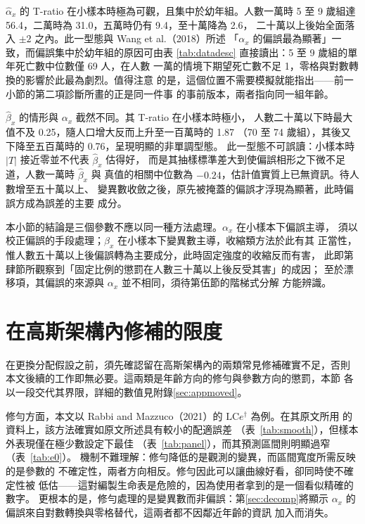 \documentclass[UTF8, fontset=macnew, a4paper, 12pt]{ctexart}
\newcommand{\LCe}{\mathrm{LC}e^{\dagger}}
\begin{document}
$\hat\alpha_x$ 的 T-ratio 在小樣本時極為可觀，且集中於幼年組。人數一萬時
5 至 9 歲組達 56.4，二萬時為 31.0，五萬時仍有 9.4，至十萬降為 2.6，
二十萬以上後始全面落入 $\pm2$ 之內。此一型態與 Wang et al.（2018）所述
「$\alpha_x$ 的偏誤最為顯著」一致，而偏誤集中於幼年組的原因可由表
\ref{tab:datadesc} 直接讀出：5 至 9 歲組的單年死亡數中位數僅 69 人，在人數
一萬的情境下期望死亡數不足 1，零格與對數轉換的影響於此最為劇烈。值得注意
的是，這個位置不需要模擬就能指出——前一小節的第二項診斷所畫的正是同一件事
的事前版本，兩者指向同一組年齡。

$\hat\beta_x$ 的情形與 $\alpha_x$ 截然不同。其 T-ratio 在小樣本時極小，
人數二十萬以下時最大值不及 0.25，隨人口增大反而上升至一百萬時的 1.87
（70 至 74 歲組），其後又下降至五百萬時的 0.76，呈現明顯的非單調型態。
此一型態不可誤讀：小樣本時 $|T|$ 接近零並不代表 $\hat\beta_x$ 估得好，
而是其抽樣標準差大到使偏誤相形之下微不足道，人數一萬時 $\hat\beta_x$ 與
真值的相關中位數為 $-0.24$，估計值實質上已無資訊。待人數增至五十萬以上、
變異數收斂之後，原先被掩蓋的偏誤才浮現為顯著，此時偏誤方成為誤差的主要
成分。

本小節的結論是三個參數不應以同一種方法處理。$\alpha_x$ 在小樣本下偏誤主導，
須以校正偏誤的手段處理；$\beta_x$ 在小樣本下變異數主導，收縮類方法於此有其
正當性，惟人數五十萬以上後偏誤轉為主要成分，此時固定強度的收縮反而有害，
此即第肆節所觀察到「固定比例的懲罰在人數三十萬以上後反受其害」的成因；
至於漂移項，其偏誤的來源與 $\alpha_x$ 並不相同，須待第伍節的階梯式分解
方能辨識。

\section{在高斯架構內修補的限度}\label{sec:limits}

在更換分配假設之前，須先確認留在高斯架構內的兩類常見修補確實不足，否則
本文後續的工作即無必要。這兩類是年齡方向的修勻與參數方向的懲罰，本節
各以一段交代其界限，詳細的數值見附錄\ref{sec:appmoved}。

修勻方面，本文以 Rabbi and Mazzuco（2021）的 $\LCe$ 為例。在其原文所用
的資料上，該方法確實如原文所述具有較小的配適誤差
（表~\ref{tab:smooth}），但樣本外表現僅在極少數設定下最佳
（表~\ref{tab:panel}），而其預測區間則明顯過窄（表~\ref{tab:e0}）。
機制不難理解：修勻降低的是觀測的變異，而區間寬度所需反映的是參數的
不確定性，兩者方向相反。修勻因此可以讓曲線好看，卻同時使不確定性被
低估——這對編製生命表是危險的，因為使用者拿到的是一個看似精確的數字。
更根本的是，修勻處理的是變異數而非偏誤：第\ref{sec:decomp}將顯示
$\alpha_x$ 的偏誤來自對數轉換與零格替代，這兩者都不因鄰近年齡的資訊
加入而消失。
\end{document}
